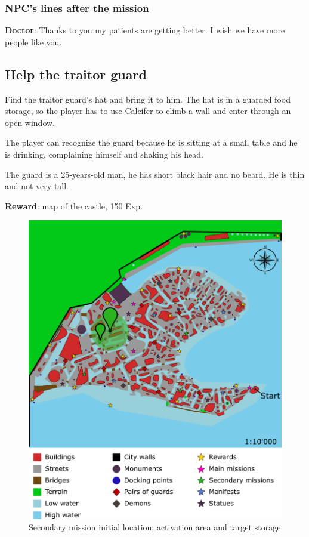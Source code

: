 \subsubsection*{NPC's lines after the mission}
\textbf{Doctor}: Thanks to you my patients are getting better. I wish we have more people like you.


\subsection{Help the traitor guard}
Find the traitor guard's hat and bring it to him. The hat is in a guarded food storage, so the player has to use Calcifer to climb a wall and enter through an open window.

The player can recognize the guard because he is sitting at a small table and he is drinking, complaining himself and shaking his head.

The guard is a 25-years-old man, he has short black hair and no beard. He is thin and not very tall.

\textbf{Reward}: map of the castle, 150 Exp.

\begin{figure}[H]
  \centering
  \includegraphics[width=\textwidth]{../Images/Maps/dynamiaSecondaryMissions_Guard}
  \caption{Secondary mission initial location, activation area and target storage}
\end{figure}

